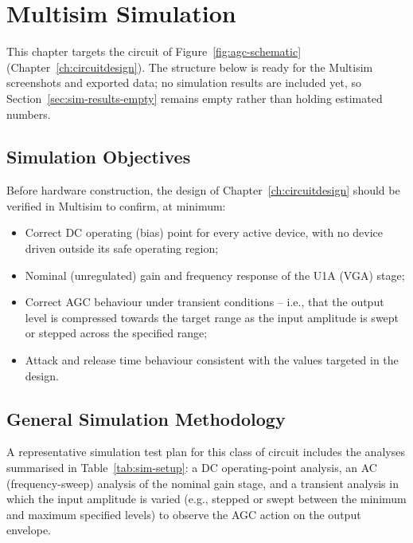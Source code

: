 \chapter{Multisim Simulation}
\label{ch:simulation}

This chapter targets the circuit of Figure~\ref{fig:agc-schematic} (Chapter~\ref{ch:circuitdesign}). The structure below is ready for the Multisim screenshots and exported data; no simulation results are included yet, so Section~\ref{sec:sim-results-empty} remains empty rather than holding estimated numbers.

\section{Simulation Objectives}

Before hardware construction, the design of Chapter~\ref{ch:circuitdesign} should be verified in Multisim to confirm, at minimum:
\begin{itemize}
    \item Correct DC operating (bias) point for every active device, with no device driven outside its safe operating region;
    \item Nominal (unregulated) gain and frequency response of the U1A (VGA) stage;
    \item Correct AGC behaviour under transient conditions -- i.e., that the output level is compressed towards the target range as the input amplitude is swept or stepped across the specified range;
    \item Attack and release time behaviour consistent with the values targeted in the design.
\end{itemize}

\section{General Simulation Methodology}

A representative simulation test plan for this class of circuit includes the analyses summarised in Table~\ref{tab:sim-setup}: a DC operating-point analysis, an AC (frequency-sweep) analysis of the nominal gain stage, and a transient analysis in which the input amplitude is varied (e.g., stepped or swept between the minimum and maximum specified levels) to observe the AGC action on the output envelope.

